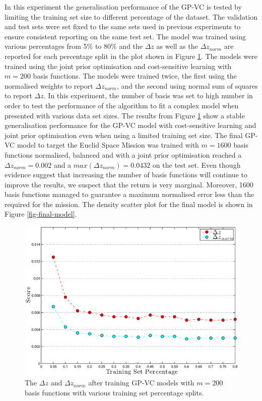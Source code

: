 \documentclass[useAMS,usenatbib,fleqn]{mn2e}
\begin{document}
In this experiment the generalisation performance of the GP-VC is tested by limiting the training set size to different percentage of the dataset. The validation and test sets were set fixed to the same sets used in previous experiments to ensure consistent reporting on the same test set. The model was trained using various percentages from 5\% to 80\% and the $\Delta z$ as well as the $\Delta z_{norm}$ are reported for each percentage split in the plot shown in Figure \ref{fig-training-percentage}. The models were trained using the joint prior optimisation and cost-sensitive learning with $m=200$ basis functions. The models were trained twice, the first using the normalised weights to report $\Delta z_{norm}$, and the second using normal sum of squares to report $\Delta z$. In this experiment, the number of basis was set to high number in order to test the performance of the algorithm to fit a complex model when presented with various data set sizes. The results from Figure \ref{fig-training-percentage} show a stable generalisation performance for the GP-VC model with cost-sensitive learning and joint prior optimisation even when using a limited training set size. The final GP-VC model to target the Euclid Space Mission was trained with $m=1600$ basis functions normalised, balanced and with a joint prior optimisation reached a $\Delta z_{norm}=0.002$ and a $max\left(\Delta z_{norm}\right)=0.0432$ on the test set. Even though evidence suggest that increasing the number of basis functions will continue to improve the results, we suspect that the return is very marginal. Moreover, 1600 basis functions managed to guarantee a maximum normalised error less than the required for the mission. The density scatter plot for the final model is shown in Figure \ref{fig-final-model}.

\begin{figure}
       \centering
        \includegraphics[width=\columnwidth]{figures/percentage.eps}
        \caption{The $\Delta z$ and $\Delta z_{norm}$ after training GP-VC models with $m=200$ basis functions with various training set percentage splits. }
       \label{fig-training-percentage}
\end{figure}
\end{document}
